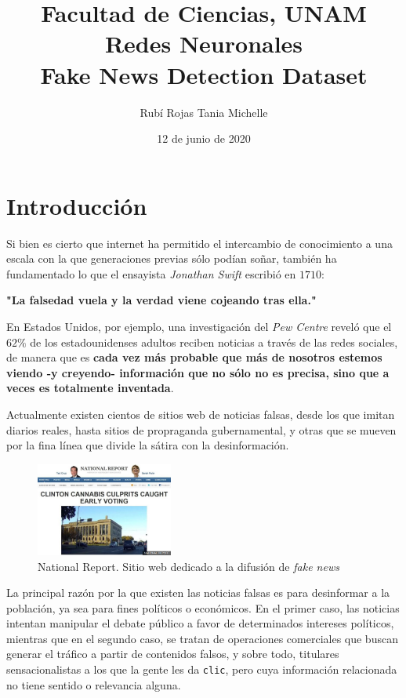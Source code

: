 \documentclass[letterpaper,11pt]{article}
\title{Facultad de Ciencias, UNAM \\ Redes Neuronales \\ 
       Fake News Detection Dataset}
\author{Rubí Rojas Tania Michelle}
\date{12 de junio de 2020}
\begin{document}
\maketitle

\section{Introducción}

Si bien es cierto que internet ha permitido el intercambio de conocimiento a una 
escala con la que generaciones previas sólo podían soñar, también ha fundamentado
lo que el ensayista \textit{Jonathan Swift} escribió en $1710$:

\begin{center}
    \textbf{"La falsedad vuela y la verdad viene cojeando tras ella."}
\end{center}   

En Estados Unidos, por ejemplo, una investigación del \textit{Pew Centre} reveló
que el $62\%$ de los estadounidenses adultos reciben noticias a través de las 
redes sociales, de manera que es \textbf{cada vez más probable que más de 
nosotros estemos viendo -y creyendo- información que no sólo no es precisa, 
sino que a veces es totalmente inventada}.

Actualmente existen cientos de sitios web de noticias falsas, desde los que 
imitan diarios reales, hasta sitios de propraganda gubernamental, y otras que se 
mueven por la fina línea que divide la sátira con la desinformación. 
\begin{figure}[ht]
    \centering
    \includegraphics[width=0.4\textwidth]{imagenes/national.png}
    \caption{National Report. Sitio web dedicado a la difusión de 
             \textit{fake news}}
\end{figure}    

La principal razón por la que existen las noticias falsas es para desinformar a
la población, ya sea para fines políticos o económicos. En el primer caso, las 
noticias intentan manipular el debate público a favor de determinados intereses 
políticos, mientras que en el segundo caso, se tratan de operaciones comerciales
que buscan generar el tráfico a partir de contenidos falsos, y sobre todo, 
titulares sensacionalistas a los que la gente les da \texttt{clic}, pero cuya 
información relacionada no tiene sentido o relevancia alguna.
\end{document}
